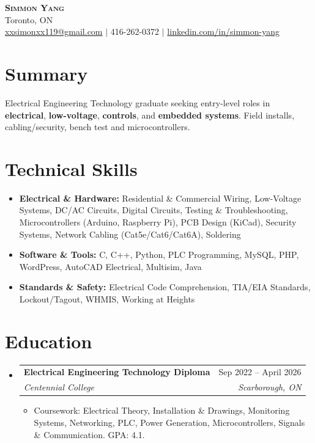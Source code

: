 \documentclass[letterpaper,11pt]{article}
\makeatletter
\newcommand{\resumeItem}[1]{\item\small{{#1 \vspace{-2pt}}}}
\newcommand{\resumeSubheading}[4]{
  \vspace{-4pt}\item
    \begin{tabular*}{0.97\textwidth}[t]{l@{\extracolsep{\fill}}r}
      \textbf{#1} & #2 \\
      \textit{\small #3} & \textit{\small #4} \\
    \end{tabular*}\vspace{-8pt}
}
\newcommand{\resumeSubHeadingListStart}{\begin{itemize}[leftmargin=0.15in, label={}]}
\newcommand{\resumeSubHeadingListEnd}{\end{itemize}}
\newcommand{\resumeItemListStart}{\begin{itemize}[nosep, topsep=1pt, itemsep=0pt, parsep=0pt, leftmargin=0.2in]}
\newcommand{\resumeItemListEnd}{\end{itemize}\vspace{-7pt}}
\makeatother
\begin{document}
\begin{center}
    \textbf{\Huge \scshape Simmon Yang} \\ \vspace{1pt}
    Toronto, ON \\ 
    \href{mailto:xxsimonxx119@gmail.com}{xxsimonxx119@gmail.com} $|$ 416-262-0372 $|$ 
    \href{https://www.linkedin.com/in/simmon-yang/}{linkedin.com/in/simmon-yang}
\end{center}

\section{Summary}
Electrical Engineering Technology graduate seeking entry-level roles in \textbf{electrical}, \textbf{low-voltage}, \textbf{controls}, and \textbf{embedded systems}. Field installs, cabling/security, bench test and microcontrollers.

\section{Technical Skills}
\begin{itemize}[leftmargin=0.15in, nosep, topsep=2pt, itemsep=1pt]
  \item \textbf{Electrical \& Hardware:} Residential \& Commercial Wiring, Low-Voltage Systems, DC/AC Circuits, Digital Circuits, Testing \& Troubleshooting, Microcontrollers (Arduino, Raspberry Pi), PCB Design (KiCad), Security Systems, Network Cabling (Cat5e/Cat6/Cat6A), Soldering
  \item \textbf{Software \& Tools:} C, C++, Python, PLC Programming, MySQL, PHP, WordPress, AutoCAD Electrical, Multisim, Java
  \item \textbf{Standards \& Safety:} Electrical Code Comprehension, TIA/EIA Standards, Lockout/Tagout, WHMIS, Working at Heights
\end{itemize}

\section{Education}
\resumeSubHeadingListStart
\resumeSubheading
  {Electrical Engineering Technology Diploma}{Sep 2022 -- April 2026}
  {Centennial College}{Scarborough, ON}
\resumeItemListStart
  \resumeItem{Coursework: Electrical Theory, Installation \& Drawings, Monitoring Systems, Networking, PLC, Power Generation, Microcontrollers, Signals \& Communication. GPA: 4.1.}
\resumeItemListEnd
\resumeSubHeadingListEnd
\end{document}
